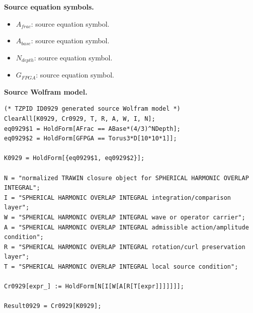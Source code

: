 \begin{minipage}[t]{0.49\linewidth}
\begingroup
\small
\raggedright
\textbf{Source equation symbols.}\par
\begin{itemize}[leftmargin=1.35em,itemsep=1pt,topsep=1pt,parsep=0pt]
    \item $A_{frac}$: source equation symbol.
    \item $A_{base}$: source equation symbol.
    \item $N_{depth}$: source equation symbol.
    \item $G_{FPGA}$: source equation symbol.
\end{itemize}
\endgroup
\end{minipage}\hfill
\begin{minipage}[t]{0.47\linewidth}
\begingroup
\scriptsize
\raggedright
\textbf{Source Wolfram model.}\par
\begin{Verbatim}[fontsize=\tiny,breaklines=true,breakanywhere=true]
(* TZPID ID0929 generated source Wolfram model *)
ClearAll[K0929, Cr0929, T, R, A, W, I, N];
eq0929$1 = HoldForm[AFrac == ABase*(4/3)^NDepth];
eq0929$2 = HoldForm[GFPGA == Torus3*D[10*10*1]];

K0929 = HoldForm[{eq0929$1, eq0929$2}];

N = "normalized TRAWIN closure object for SPHERICAL HARMONIC OVERLAP INTEGRAL";
I = "SPHERICAL HARMONIC OVERLAP INTEGRAL integration/comparison layer";
W = "SPHERICAL HARMONIC OVERLAP INTEGRAL wave or operator carrier";
A = "SPHERICAL HARMONIC OVERLAP INTEGRAL admissible action/amplitude condition";
R = "SPHERICAL HARMONIC OVERLAP INTEGRAL rotation/curl preservation layer";
T = "SPHERICAL HARMONIC OVERLAP INTEGRAL local source condition";

Cr0929[expr_] := HoldForm[N[I[W[A[R[T[expr]]]]]]];

Result0929 = Cr0929[K0929];
\end{Verbatim}
\endgroup
\end{minipage}

